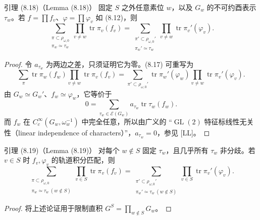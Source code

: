 \begin{originaltheorem}{引理 (8.18)（Lemma (8.18)）}
固定 $S$ 之外任意素位 $w$，以及 $G_w$ 的不可约酉表示 $\tau_w$。若
$f=\prod f_v$、$\varphi=\prod\varphi_v$ 如 (8.12)，则
\[
 \sum_{\substack{\pi\subset\rho_{\omega,0}\\\pi_w\simeq\tau_w}}
 \prod_{v\ne w}\operatorname{tr}\pi_v(f_v)
 =\sum_{\substack{\pi'\subset\rho_{\omega,0}'\\\pi_w'\simeq\tau_w}}
 \prod_{v\ne w}\operatorname{tr}\pi_v'(\varphi_v).
\]
\end{originaltheorem}
\begin{proof}
令 $a_{\tau_w}$ 为两边之差，只须证明它为零。(8.17) 可重写为
\[
 \sum_\pi\operatorname{tr}\pi_w(f_w)\prod_{v\ne w}\operatorname{tr}\pi_v(f_v)
 =\sum_{\pi'\subset\rho_{\omega,0}'}\operatorname{tr}\pi_w'(\varphi_w)
 \prod_{v\ne w}\operatorname{tr}\pi_v'(\varphi_v).
\]
由 $G_w\simeq G_w'$、$f_w\simeq\varphi_w$，它等价于
\[
 0=\sum_{\tau_w\in\mathcal E(G_w)}a_{\tau_w}\operatorname{tr}\tau_w(f_w).
\]
而 $f_w$ 在 $C_c^\infty(G_w,\omega_w^{-1})$ 中完全任意，所以由广义的
“$\operatorname{GL}(2)$ 特征标线性无关性（linear independence of characters）”，$a_{\tau_w}=0$，参见 [LL]。
\end{proof}

\begin{originaltheorem}{引理 (8.19)（Lemma (8.19)）}
对每个 $w\notin S$ 固定 $\tau_w$，且几乎所有 $\tau_w$ 非分歧。若 $v\in S$ 时
$f_v,\varphi_v$ 的轨道积分匹配，则
\begin{equation}
 \sum_{\substack{\pi\subset\rho_{\omega,0}\\\pi_w\simeq\tau_w\ (w\notin S)}}
 \prod_{v\in S}\operatorname{tr}\pi_v(f_v)
 =\sum_{\substack{\pi'\subset\rho_{\omega,0}'\\\pi_w'\simeq\tau_w\ (w\notin S)}}
 \prod_{v\in S}\operatorname{tr}\pi_v'(\varphi_v).\tag{8.20}
\end{equation}
\end{originaltheorem}
\begin{proof}
将上述论证用于限制直积 $G^S=\prod_{w\notin S}G_w$。
\end{proof}

